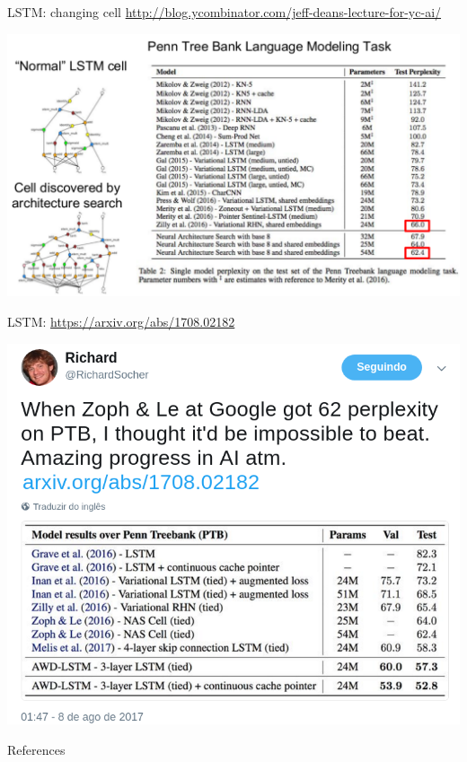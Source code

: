 \documentclass[10pt]{beamer}
\begin{document}
\begin{frame}{LSTM: changing cell}
\url{http://blog.ycombinator.com/jeff-deans-lecture-for-yc-ai/}

\begin{center}
\includegraphics[scale=0.45]{images/JeffDeanLectureforYCAI.pdf}
\end{center}
\nocite{DeepLearningbook}

\end{frame}


\begin{frame}{LSTM: \url{https://arxiv.org/abs/1708.02182}}

\begin{center}
\includegraphics[scale=0.34]{images/SocherPTB.png}
\end{center}

\end{frame}


\begin{frame}[allowframebreaks]{References}

  
  

\end{frame}
\end{document}
